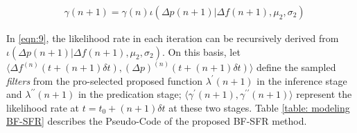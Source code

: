 \documentclass[lettersize,journal]{IEEEtran}
\begin{document}
\vspace{-0.125in}
\begin{align}\label{eqn:9}
	 & \gamma(n+1)=
	\gamma(n)\iota(\varDelta p(n+1)|\varDelta f(n+1),\mu_2,\sigma_2)
\end{align}

In \eqref{eqn:9}, the likelihood rate in each iteration can be recursively derived from $\iota(\varDelta p(n+1)|\varDelta f(n+1),\mu_2,\sigma_2)$. On this basis, let $\langle \varDelta f^{(n)}(t+(n+1)\delta t), \left( \varDelta p\right)^{(n)}(t+(n+1)\delta t)\rangle$ define the sampled \textit{filters} from the pro-selected proposed function $\lambda^{\prime}(n+1)$ in the inference stage and $\lambda^{\prime\prime}(n+1)$ in the predication stage; $\langle\gamma^{\prime}(n+1),\gamma^{\prime\prime}(n+1)\rangle$ represent the likelihood rate at $t\!=\! t_0 + (n+1)\delta t$ at these two stages. Table \ref{table: modeling BF-SFR} describes the Pseudo-Code of the proposed BF-SFR method.
\end{document}
